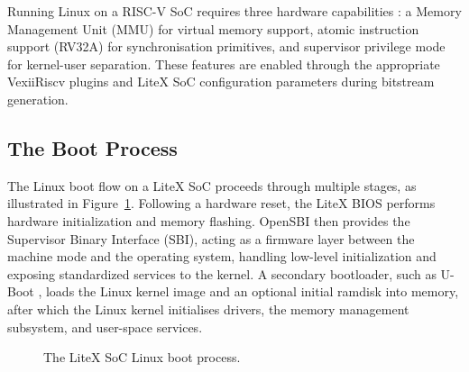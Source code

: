 Running Linux on a RISC-V SoC requires three hardware capabilities
\cite{LinuxOnLiteXGitHub}: a Memory Management Unit (MMU) for virtual memory support,
atomic instruction support (RV32A) for synchronisation primitives, and supervisor
privilege mode for kernel-user separation.
These features are enabled through the appropriate VexiiRiscv plugins and LiteX SoC
configuration parameters during bitstream generation.

\subsection{The Boot Process}
\label{subsec:boot_process}

The Linux boot flow on a LiteX SoC proceeds through multiple stages, as illustrated
in Figure~\ref{fig:boot_process}.
Following a hardware reset, the LiteX BIOS performs hardware
initialization and memory flashing.
OpenSBI \cite{OpenSBIGithub} then provides the Supervisor Binary Interface (SBI),
acting as a firmware layer between the machine mode and the operating system, handling
low-level initialization and exposing standardized services to the kernel.
A secondary bootloader, such as U-Boot \cite{UBootWebsite}, loads the Linux kernel image
and an optional initial ramdisk into memory, after which the Linux kernel initialises
drivers, the memory management subsystem, and user-space services.

\begin{figure}[htb]
    \centering
    \caption{The LiteX SoC Linux boot process.}
    \label{fig:boot_process}
\end{figure}

